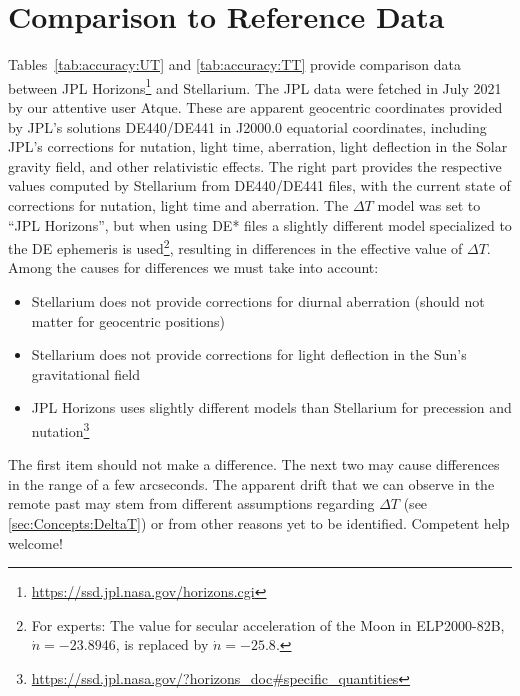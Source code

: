 \section{Comparison to Reference Data}
\label{sec:Accuracy:JPLcomparison}

Tables~\ref{tab:accuracy:UT} and \ref{tab:accuracy:TT} 
provide comparison data between JPL
Horizons\footnote{\url{https://ssd.jpl.nasa.gov/horizons.cgi}} and
Stellarium. The JPL data were fetched in July 2021 by our
attentive user Atque. These are apparent geocentric coordinates
provided by JPL's solutions DE440/DE441 in J2000.0 equatorial
coordinates, including JPL's corrections for nutation, light time,
aberration, light deflection in the Solar gravity field, and other
relativistic effects. The right part provides the respective values
computed by Stellarium from DE440/DE441 files, with the current state of corrections for
nutation, light time and aberration. The $\Delta T$ model was set to
``JPL Horizons'', but when using DE* files a slightly different model
specialized to the DE ephemeris is used\footnote{For experts: The value
  for secular acceleration of the Moon in ELP2000-82B, $\dot{n}=-23.8946$,
  is replaced by $\dot{n}=-25.8$.}, resulting in differences in the effective 
  value of $\Delta T$.  Among the causes for differences we must take into account:
\begin{itemize}
\item Stellarium does not provide corrections for diurnal aberration (should not matter for geocentric positions)
\item Stellarium does not provide corrections for light deflection in the Sun's gravitational field
\item JPL Horizons uses slightly different models than Stellarium for precession and nutation\footnote{\url{https://ssd.jpl.nasa.gov/?horizons_doc#specific_quantities}}
\end{itemize}
The first item should not make a difference. The next two may cause
differences in the range of a few arcseconds. The apparent drift that
we can observe in the remote past may stem from different assumptions
regarding $\Delta T$ (see \ref{sec:Concepts:DeltaT}) or from other
reasons yet to be identified. Competent help welcome!

\noindent
\colorbox{light-gray}{}



\scriptsize


\normalsize





